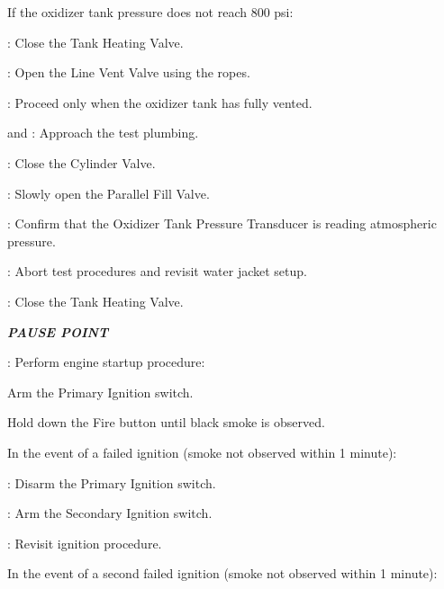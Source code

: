 \begin{checklist}
    \begin{checklist}[label=$\bullet$]
        \item If the oxidizer tank pressure does not reach 800 psi:
        \begin{checklist}
            \item \heat: Close the Tank Heating Valve.
            \item \primary{}: Open the Line Vent Valve using the ropes.
            \item \secondary: Proceed only when the oxidizer tank has fully vented.
            \item \primary{} and \secondary: Approach the test plumbing.
            \item \primary{}: Close the Cylinder Valve.
            \item \primary{}: Slowly open the Parallel Fill Valve.
            \item \daq{}: Confirm that the Oxidizer Tank Pressure Transducer is reading atmospheric pressure.
            \item \ops{}: Abort test procedures and revisit water jacket setup.
        \end{checklist}
    \end{checklist}
    \item \heat: Close the Tank Heating Valve.
    \item \textbf{\textit{PAUSE POINT}}
    \item \primary{}: Perform engine startup procedure:
    \begin{checklist}
        \item Arm the Primary Ignition switch.
        \item Hold down the Fire button until black smoke is observed.
        \begin{checklist}[label=$\bullet$]
            \item In the event of a failed ignition (smoke not observed within 1 minute):
            \begin{checklist}
                \item \primary: Disarm the Primary Ignition switch.
                \item \primary: Arm the Secondary Ignition switch.
                \item \ops: Revisit ignition procedure.
            \end{checklist}
            \item In the event of a second failed ignition (smoke not observed within 1 minute):

\end{checklist}
\end{checklist}
\end{checklist}
